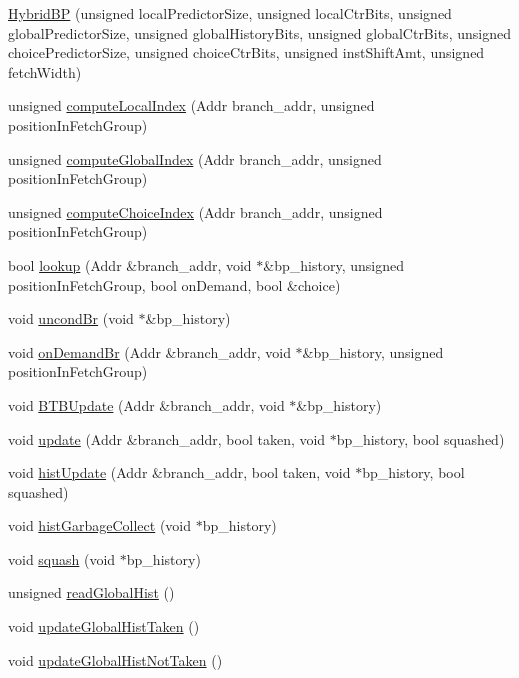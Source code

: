 \begin{DoxyCompactItemize}
\item 
\hyperlink{classHybridBP_a7c16ca06091c02d049ec629439adc861}{HybridBP} (unsigned localPredictorSize, unsigned localCtrBits, unsigned globalPredictorSize, unsigned globalHistoryBits, unsigned globalCtrBits, unsigned choicePredictorSize, unsigned choiceCtrBits, unsigned instShiftAmt, unsigned fetchWidth)
\item 
unsigned \hyperlink{classHybridBP_a3775bffe64cdade937a9f92746c21ce0}{computeLocalIndex} (Addr branch\_\-addr, unsigned positionInFetchGroup)
\item 
unsigned \hyperlink{classHybridBP_a04bce6884d86fea1130106447ce996a6}{computeGlobalIndex} (Addr branch\_\-addr, unsigned positionInFetchGroup)
\item 
unsigned \hyperlink{classHybridBP_a198dcbee6554ca9471fba00734e31319}{computeChoiceIndex} (Addr branch\_\-addr, unsigned positionInFetchGroup)
\item 
bool \hyperlink{classHybridBP_a6aef367656e0d8c3b964bfb4e69858fa}{lookup} (Addr \&branch\_\-addr, void $\ast$\&bp\_\-history, unsigned positionInFetchGroup, bool onDemand, bool \&choice)
\item 
void \hyperlink{classHybridBP_a298bbbcf380b81292e158a5d880073d4}{uncondBr} (void $\ast$\&bp\_\-history)
\item 
void \hyperlink{classHybridBP_aa54c3620546c026eb4d593007adc5baf}{onDemandBr} (Addr \&branch\_\-addr, void $\ast$\&bp\_\-history, unsigned positionInFetchGroup)
\item 
void \hyperlink{classHybridBP_a89edda03644e8f68ff703b4452569186}{BTBUpdate} (Addr \&branch\_\-addr, void $\ast$\&bp\_\-history)
\item 
void \hyperlink{classHybridBP_a61c2bdd85d221b11539524613e2f4ca5}{update} (Addr \&branch\_\-addr, bool taken, void $\ast$bp\_\-history, bool squashed)
\item 
void \hyperlink{classHybridBP_a057bdd611cf2f46e8465df5376a72efb}{histUpdate} (Addr \&branch\_\-addr, bool taken, void $\ast$bp\_\-history, bool squashed)
\item 
void \hyperlink{classHybridBP_a42988126b43e89e1ec5fb5a1985a0a36}{histGarbageCollect} (void $\ast$bp\_\-history)
\item 
void \hyperlink{classHybridBP_aa69f90a513749a5ef74eb9e1bc2582a5}{squash} (void $\ast$bp\_\-history)
\item 
unsigned \hyperlink{classHybridBP_a9e592ec11566122ebd7f13a6e2b7c422}{readGlobalHist} ()
\item 
void \hyperlink{classHybridBP_a19172b0c80d04265cb00f249bbf5eecd}{updateGlobalHistTaken} ()
\item 
void \hyperlink{classHybridBP_aa5cd12f887d1f51947dc37cdad283124}{updateGlobalHistNotTaken} ()
\end{DoxyCompactItemize}


